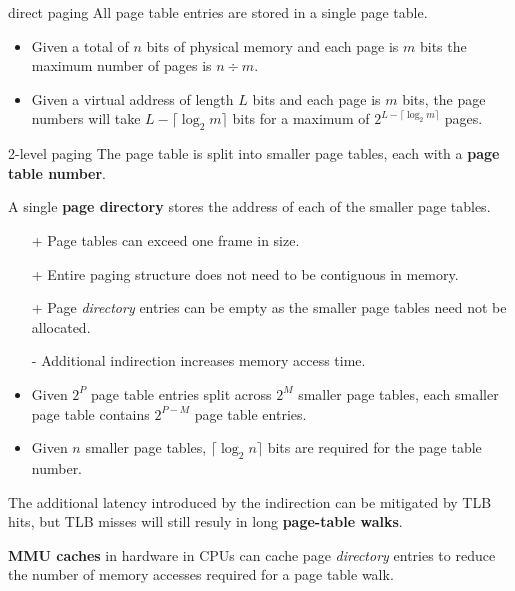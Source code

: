 \begin{defn}{direct paging}
    All page table entries are stored in a single page table.

    \begin{itemize}
        \item Given a total of $n$ bits of physical memory and each page is $m$ bits
              the maximum number of pages is $n \div m$.
        \item Given a virtual address of length $L$ bits and each page is $m$ bits,
              the page numbers will take $L - \lceil \log_{2}m \rceil$ bits for a maximum of $2^{L - \lceil \log_{2}m \rceil}$ pages.
    \end{itemize}
\end{defn}

\begin{defn}{2-level paging}
    The page table is split into smaller page tables, each with a \textbf{page table number}.

    A single \textbf{page directory} stores the address of each of the smaller page tables.

    \begin{itemize}
        \item[+] Page tables can exceed one frame in size.
        \item[+] Entire paging structure does not need to be contiguous in memory.
        \item[+] Page \textit{directory} entries can be empty as the smaller page tables need not be allocated.
        \item[-] Additional indirection increases memory access time.
    \end{itemize}

    \begin{itemize}
        \item Given $2^P$ page table entries split across $2^M$ smaller page tables, each smaller page table contains $2^{P - M}$ page table entries.
        \item Given $n$ smaller page tables, $\lceil \log_{2}n \rceil$ bits are required for the page table number.
    \end{itemize}
\end{defn}

The additional latency introduced by the indirection can be mitigated by TLB hits, but TLB misses will still resuly in long \textbf{page-table walks}.

\textbf{MMU caches} in hardware in CPUs can cache page \textit{directory} entries to reduce the number of memory accesses required for a page table walk.

